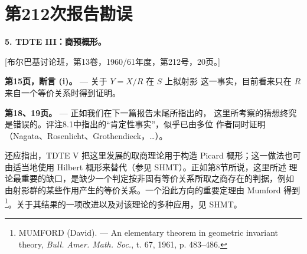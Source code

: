 \clearpage
\chapter*{第212次报告勘误}
\setcounter{footnote}{2}

\noindent\textbf{5. TDTE III：商预概形。}

\begin{center}
[布尔巴基讨论班，第13卷，1960/61年度，第212号，20页。]
\end{center}

\noindent\textbf{第15页，断言 (i)。} --- 关于 $Y=X/R$ 在 $S$ 上拟射影
这一事实，目前看来只在 $R$ 来自一个等价关系时得到证明。

\noindent\textbf{第18、19页。} --- 正如我们在下一篇报告末尾所指出的，
这里所考察的猜想终究是错误的。评注8.1中指出的“肯定性事实”，似乎已由多位
作者同时证明（Nagata、Rosenlicht、Grothendieck，\ldots）。

还应指出，TDTE V 把这里发展的取商理论用于构造 Picard 概形；这一做法也可
由适当地使用 Hilbert 概形来替代（参见 SHMT）。正如第8节所说，这里所述
理论最重要的缺口，是缺少一个判定按非固有等价关系所取之商存在的判据，例如
由射影群的某些作用产生的等价关系。一个沿此方向的重要定理由 Mumford
得到\footnote{MUMFORD (David). --- An elementary theorem in geometric
invariant theory, \emph{Bull. Amer. Math. Soc.}, t. 67, 1961,
p. 483--486.}。关于其结果的一项改进以及对该理论的多种应用，见 SHMT。
